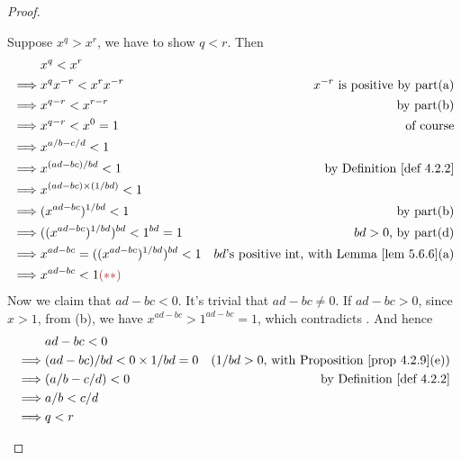 \begin{proof}
\begin{enumerate}
\begin{itemize}
        Suppose \(x^q > x^r\), we have to show \(q < r\).
        Then
        \begin{align*}
                     & x^q < x^r \\
            \implies & x^q x^{-r} < x^r x^{-r} & \text{\(x^{-r}\) is positive by part(a)}\\
            \implies & x^{q - r} < x^{r - r} & \text{by part(b)} \\
            \implies & x^{q - r} < x^0 = 1 & \text{of course} \\
            \implies & x^{a/b - c/d} < 1 & \\
            \implies & x^{(ad - bc)/bd} < 1 & \text{by \DEF{4.2.2}} \\
            \implies & x^{(ad - bc) \X (1/bd)} < 1 \\
            \implies & (x^{ad - bc})^{1/bd} < 1 & \text{by part(b)} \\
            \implies & ((x^{ad - bc})^{1/bd})^{bd} < 1^{bd} = 1 & \text{\(bd > 0\), by part(d)} \\
            \implies & x^{ad - bc} = ((x^{ad - bc})^{1/bd})^{bd} < 1 & \text{\(bd\)'s positive int, with \LEM{5.6.6}(a)} \\
            \implies & x^{ad - bc} < 1 \MAROON{(**)}
        \end{align*}
        Now we claim that \(ad - bc < 0\).
        It's trivial that \(ad - bc \neq 0\).
        If \(ad - bc > 0\), since \(x > 1\), from (b), we have \(x^{ad - bc} > 1^{ad - bc} = 1\), which contradicts \MAROON{(**)}.
        And hence
        \begin{align*}
                     & ad - bc < 0 \\
            \implies & (ad - bc)/bd < 0 \X 1/bd = 0 & \text{(\(1/bd > 0\), with \PROP{4.2.9}(e))} \\
            \implies & (a/b - c/d) < 0 & \text{by \DEF{4.2.2}} \\
            \implies & a/b < c/d \\
            \implies & q < r
        \end{align*}
        

\end{itemize}
\end{enumerate}
\end{proof}
